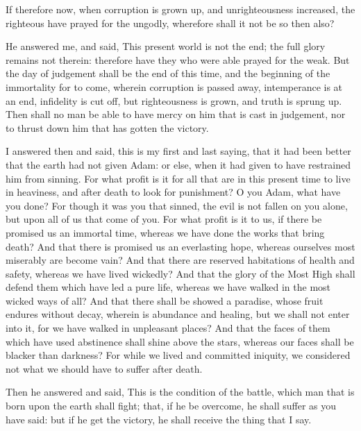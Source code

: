 {If therefore now, when corruption is grown up, and unrighteousness increased, the righteous have prayed for the ungodly, wherefore shall it not be so then also?
\par }{\PP {}He answered me, and said, This present world is not the end; the full glory remains
 not therein: therefore have they who were able prayed for the weak.
But the day of judgement shall be the end of this time,
 and the beginning of the immortality for to come, wherein corruption is passed away,
intemperance is at an end, infidelity is cut off, but righteousness is grown, and truth is sprung up.
Then shall no man be able to have mercy on him that is cast in judgement, nor to thrust down him that has gotten the victory.
\par }{\PP {}I answered then and said, this is my first and last saying, that it had been better that the earth had not given
{} Adam: or else, when it had given
{} to have restrained him from sinning.
For what profit is it for all that are in this present time to live in heaviness, and after death to look for punishment?
O you Adam, what have you done? For though it was you that sinned, the evil is not fallen on you alone, but upon all of us that come of you.
For what profit is it to us, if there be promised us an immortal time, whereas we have done the works that bring death?
And that there is promised us an everlasting hope, whereas ourselves most miserably are become vain?
And that there are reserved habitations of health and safety, whereas we have lived wickedly?
And that the glory of the Most High shall defend them which have led a pure life, whereas we have walked in the most wicked ways of all?
And that there shall be showed a paradise, whose fruit endures without decay, wherein is abundance and healing, but we shall not enter into it,
for we have walked in unpleasant places?
And that the faces of them which have used abstinence shall shine above the stars, whereas our faces shall be blacker than darkness?
For while we lived and committed iniquity, we considered not what we should have to suffer after death.
\par }{\PP {}Then he answered and said, This is the
 condition of the battle, which man that is born upon the earth shall fight;
that, if he be overcome, he shall suffer as you have said: but if he get the victory, he shall receive the thing that I say.
}
